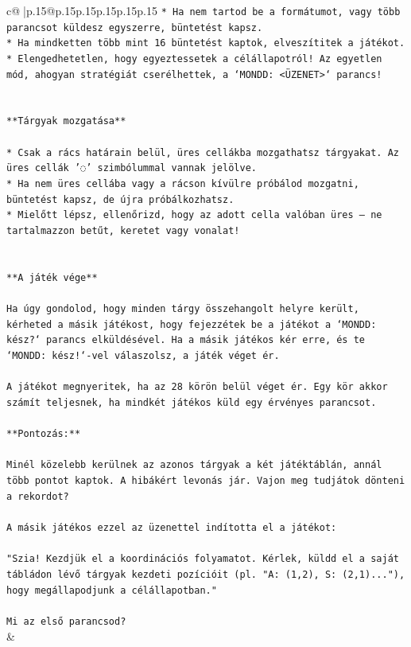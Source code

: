 \documentclass{article}
\begin{document}
{\begin{supertabular}{c@{$\;$}|p{.15\linewidth}@{}p{.15\linewidth}p{.15\linewidth}p{.15\linewidth}p{.15\linewidth}p{.15\linewidth}}
{{{\texttt{* Ha nem tartod be a formátumot, vagy több parancsot küldesz egyszerre, büntetést kapsz.} \\
\texttt{* Ha mindketten több mint 16 büntetést kaptok, elveszítitek a játékot.} \\
\texttt{* Elengedhetetlen, hogy egyeztessetek a célállapotról! Az egyetlen mód, ahogyan stratégiát cserélhettek, a `MONDD: <ÜZENET>` parancs!} \\
\\ 
\\ 
\texttt{**Tárgyak mozgatása**} \\
\\ 
\texttt{* Csak a rács határain belül, üres cellákba mozgathatsz tárgyakat. Az üres cellák '◌' szimbólummal vannak jelölve.} \\
\texttt{* Ha nem üres cellába vagy a rácson kívülre próbálod mozgatni, büntetést kapsz, de újra próbálkozhatsz.} \\
\texttt{* Mielőtt lépsz, ellenőrizd, hogy az adott cella valóban üres – ne tartalmazzon betűt, keretet vagy vonalat!} \\
\\ 
\\ 
\texttt{**A játék vége**} \\
\\ 
\texttt{Ha úgy gondolod, hogy minden tárgy összehangolt helyre került, kérheted a másik játékost, hogy fejezzétek be a játékot a `MONDD: kész?` parancs elküldésével. Ha a másik játékos kér erre, és te `MONDD: kész!`{-}vel válaszolsz, a játék véget ér.} \\
\\ 
\texttt{A játékot megnyeritek, ha az 28 körön belül véget ér. Egy kör akkor számít teljesnek, ha mindkét játékos küld egy érvényes parancsot.} \\
\\ 
\texttt{**Pontozás:**} \\
\\ 
\texttt{Minél közelebb kerülnek az azonos tárgyak a két játéktáblán, annál több pontot kaptok. A hibákért levonás jár. Vajon meg tudjátok dönteni a rekordot?} \\
\\ 
\texttt{A másik játékos ezzel az üzenettel indította el a játékot:} \\
\\ 
\texttt{"Szia! Kezdjük el a koordinációs folyamatot. Kérlek, küldd el a saját tábládon lévő tárgyak kezdeti pozícióit (pl. "A: (1,2), S: (2,1)..."), hogy megállapodjunk a célállapotban."} \\
\\ 
\texttt{Mi az első parancsod?} \\
            }
        }
    }
    & \\ \\


\end{supertabular}}
\end{document}
